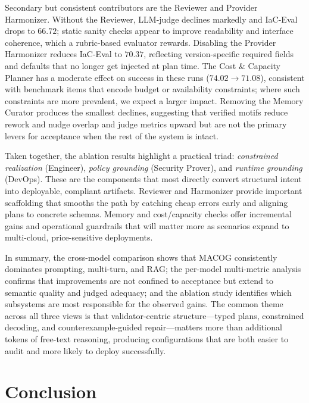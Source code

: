 \documentclass[acmsmall,screen,review,anonymous]{acmart}
\begin{document}
Secondary but consistent contributors are the Reviewer and Provider Harmonizer. Without the Reviewer, LLM-judge declines markedly and IaC-Eval drops to \(66.72\); static sanity checks appear to improve readability and interface coherence, which a rubric-based evaluator rewards. Disabling the Provider Harmonizer reduces IaC-Eval to \(70.37\), reflecting version-specific required fields and defaults that no longer get injected at plan time. The Cost \& Capacity Planner has a moderate effect on success in these runs (\(74.02 \rightarrow 71.08\)), consistent with benchmark items that encode budget or availability constraints; where such constraints are more prevalent, we expect a larger impact. Removing the Memory Curator produces the smallest declines, suggesting that verified motifs reduce rework and nudge overlap and judge metrics upward but are not the primary levers for acceptance when the rest of the system is intact.

Taken together, the ablation results highlight a practical triad: \emph{constrained realization} (Engineer), \emph{policy grounding} (Security Prover), and \emph{runtime grounding} (DevOps). These are the components that most directly convert structural intent into deployable, compliant artifacts. Reviewer and Harmonizer provide important scaffolding that smooths the path by catching cheap errors early and aligning plans to concrete schemas. Memory and cost/capacity checks offer incremental gains and operational guardrails that will matter more as scenarios expand to multi-cloud, price-sensitive deployments.

In summary, the cross-model comparison shows that MACOG consistently dominates prompting, multi-turn, and RAG; the per-model multi-metric analysis confirms that improvements are not confined to acceptance but extend to semantic quality and judged adequacy; and the ablation study identifies which subsystems are most responsible for the observed gains. The common theme across all three views is that validator-centric structure—typed plans, constrained decoding, and counterexample-guided repair—matters more than additional tokens of free-text reasoning, producing configurations that are both easier to audit and more likely to deploy successfully.


\section{Conclusion}
\end{document}
